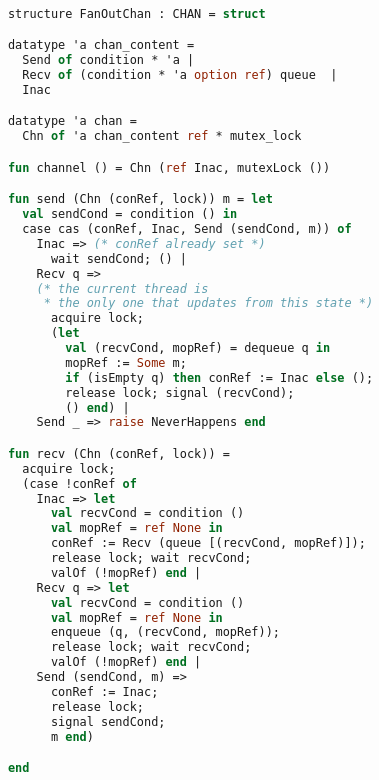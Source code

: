 \documentclass{article}
\begin{document}
    \begin{lstlisting}[language=ML, style=codestyle1]

      structure FanOutChan : CHAN = struct

      datatype 'a chan_content =
        Send of condition * 'a |
        Recv of (condition * 'a option ref) queue  |
        Inac

      datatype 'a chan =
        Chn of 'a chan_content ref * mutex_lock

      fun channel () = Chn (ref Inac, mutexLock ())

      fun send (Chn (conRef, lock)) m = let
        val sendCond = condition () in
        case cas (conRef, Inac, Send (sendCond, m)) of
          Inac => (* conRef already set *)
            wait sendCond; () |
          Recv q => 
          (* the current thread is
           * the only one that updates from this state *)
            acquire lock;
            (let
              val (recvCond, mopRef) = dequeue q in
              mopRef := Some m; 
              if (isEmpty q) then conRef := Inac else (); 
              release lock; signal (recvCond);
              () end) |
          Send _ => raise NeverHappens end

      fun recv (Chn (conRef, lock)) =
        acquire lock;
        (case !conRef of
          Inac => let
            val recvCond = condition ()
            val mopRef = ref None in
            conRef := Recv (queue [(recvCond, mopRef)]);
            release lock; wait recvCond;
            valOf (!mopRef) end |
          Recv q => let
            val recvCond = condition () 
            val mopRef = ref None in
            enqueue (q, (recvCond, mopRef));
            release lock; wait recvCond;
            valOf (!mopRef) end |
          Send (sendCond, m) =>
            conRef := Inac;
            release lock;
            signal sendCond;
            m end) 

      end 
    \end{lstlisting}
\end{document}
